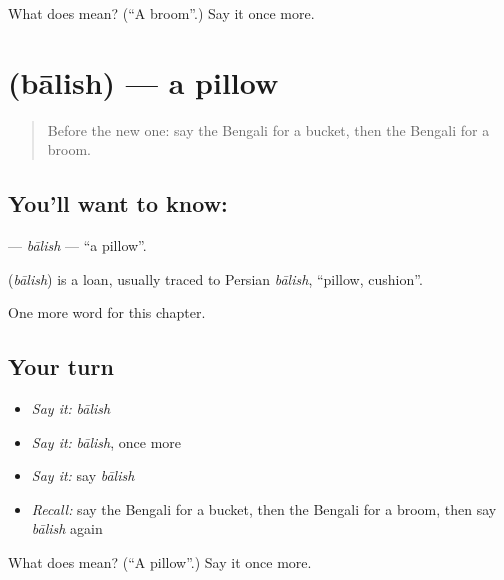 \begin{tcolorbox}[breakable,colback=teal!4,colframe=teal!35!black,title={Before you move on}]
What does  mean? (\textquotedblleft{}A broom\textquotedblright{}.) Say it once more.
\end{tcolorbox}
\section[\texorpdfstring{\bn{বালিশ} (bālish)}{বালিশ (bālish)}]{ (bālish) — a pillow}

\label{lesson:BN-C108-balish}



\begin{quote}
Before the new one: say the Bengali for a bucket, then the Bengali for a broom.
\end{quote}

\subsection*{You'll want to know: }
\textbf{} — \emph{bālish} — \textquotedblleft{}a pillow\textquotedblright{}.

\begin{cousinweb}
\textbf{} (\emph{bālish}) is a loan, usually traced to Persian \emph{bālish}, \textquotedblleft{}pillow, cushion\textquotedblright{}.
\end{cousinweb}

\begin{grammarlens}[title={What you've built}]
One more word for this chapter.
\end{grammarlens}

\subsection*{Your turn}
\begin{itemize}
\raggedright
  \item \emph{Say it:} \emph{bālish}
  \item \emph{Say it:} \emph{bālish}, once more
  \item \emph{Say it:} say \emph{bālish}
  \item \emph{Recall:} say the Bengali for a bucket, then the Bengali for a broom, then say \emph{bālish} again
\end{itemize}

\begin{tcolorbox}[breakable,colback=teal!4,colframe=teal!35!black,title={Before you move on}]
What does  mean? (\textquotedblleft{}A pillow\textquotedblright{}.) Say it once more.
\end{tcolorbox}
